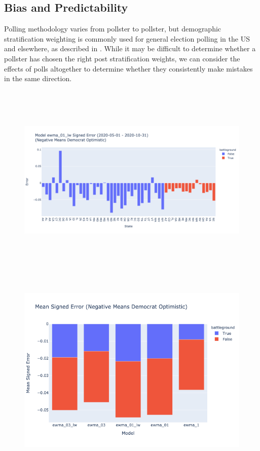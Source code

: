 \begin{table}[H]
    \centering
    
    \label{tab:aggregate_polling_2020-05-01_-_2020-10-31_mean_sample_size}
\end{table}

\subsection{Bias and Predictability}
Polling methodology varies from pollster to pollster, but demographic stratification weighting is commonly used for general election polling in the US and elsewhere, as described in \cite{Lauderdale2020ModelbasedPP}. While it may be difficult to determine whether a pollster has chosen the right post stratification weights, we can consider the effects of polls altogether to determine whether they consistently make mistakes in the same direction. 

\begin{figure}[H]
    \centering
    \includegraphics[height=25em]{figures/ewma_01_lw_2020-05-01-2020-10-31_signed_error.png}
    \label{fig:ewma_01_lw_2020-05-01-2020-10-31_signed_error}
\end{figure}


\begin{figure}[H]
    \centering
    \includegraphics[height=26em]{figures/ewma_03_lw_ewma_03_ewma_01_lw_ewma_01_ewma_1_mean_signed_error.png}
    \label{fig:ewma_03_lw_ewma_03_ewma_01_lw_ewma_01_ewma_1_mean_signed_error}
\end{figure}
